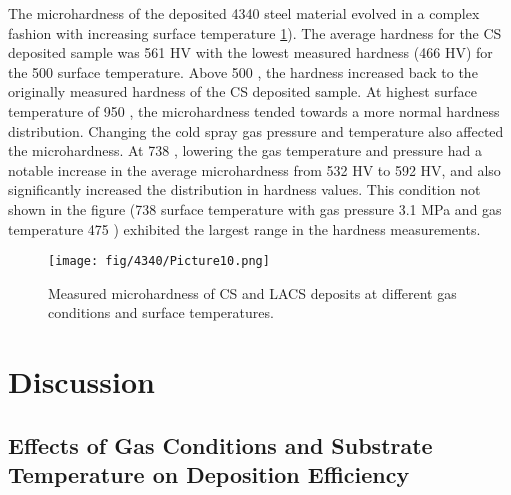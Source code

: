 The microhardness of the deposited 4340 steel material evolved in a complex fashion with increasing surface temperature \ref{fig:434010}). The average hardness for the CS deposited sample was 561 HV with the lowest measured hardness (466 HV) for the 500 \celsius{} surface temperature. Above 500 \celsius{}, the hardness increased back to the originally measured hardness of the CS deposited sample. At highest surface temperature of 950 \celsius{}, the microhardness tended towards a more normal hardness distribution. Changing the cold spray gas pressure and temperature also affected the microhardness. At 738 \celsius{}, lowering the gas temperature and pressure had a notable increase in the average microhardness from 532 HV to 592 HV, and also significantly increased the distribution in hardness values. This condition not shown in the figure (738 \celsius{} surface temperature with gas pressure 3.1 MPa and gas temperature 475 \celsius{}) exhibited the largest range in the hardness measurements.


\begin{figure}
	\centering
	\texttt{[image: fig/4340/Picture10.png]}
	\caption{Measured microhardness of CS and LACS deposits at different gas conditions and surface temperatures.}
	\label{fig:434010}
\end{figure}


\section*{Discussion}

\subsection*{Effects of Gas Conditions and Substrate Temperature on Deposition Efficiency}


